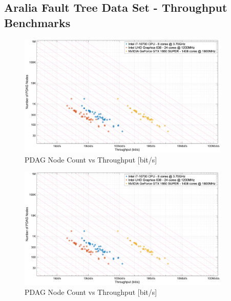 \subsection{Aralia Fault Tree Data Set - Throughput Benchmarks}
\begin{frame}
    \begin{figure}[h]
    \centering
    \includegraphics[width=0.9\textwidth]{4_casestudy/throughput/slides_nodes_vs_throughput.eps}
    \caption{PDAG Node Count vs Throughput [bit/s]}
    \label{fig:nodes_vs_throughput}
\end{figure}
\end{frame}


\begin{frame}
    \begin{figure}[h]
    \centering
    \includegraphics[width=0.9\textwidth]{4_casestudy/throughput/slides_nodes_vs_throughput.eps}
    \caption{PDAG Node Count vs Throughput [bit/s]}
    \label{fig:nodes_vs_throughput}
\end{figure}
\end{frame}


